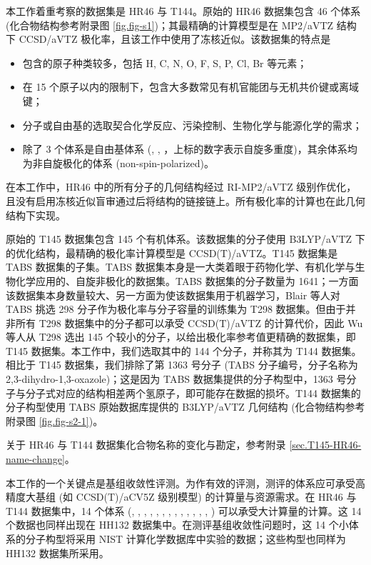 本工作着重考察的数据集是 HR46 与 T144。原始的 HR46 数据集\cite{Hickey-Rowley.JPCA.2014}包含 46 个体系 (化合物结构参考附录图 \ref{fig.fig-s1})；其最精确的计算模型是在 MP2/aVTZ 结构下 CCSD/aVTZ 极化率，且该工作中使用了冻核近似。该数据集的特点是
\begin{itemize}[nosep]
    \item 包含的原子种类较多，包括 H, C, N, O, F, S, P, Cl, Br 等元素；
    \item 在 15 个原子以内的限制下，包含大多数常见有机官能团与无机共价键或离域键；
    \item 分子或自由基的选取契合化学反应、污染控制、生物化学与能源化学的需求；
    \item 除了 3 个体系是自由基体系 (, , ，上标的数字表示自旋多重度)，其余体系均为非自旋极化的体系 (non-spin-polarized)。
\end{itemize}
在本工作中，HR46 中的所有分子的几何结构经过 RI-MP2/aVTZ 级别作优化，且没有启用冻核近似\alert{盲审通过后将结构的链接链上}。所有极化率的计算也在此几何结构下实现。

原始的 T145 数据集\cite{Wu-Thakkar.CPL.2015}包含 145 个有机体系。该数据集的分子使用 B3LYP/aVTZ 下的优化结构，最精确的极化率计算模型是 CCSD(T)/aVTZ。T145 数据集是 TABS 数据集\cite{Blair-Thakkar.CTC.2014}的子集。TABS 数据集本身是一大类着眼于药物化学、有机化学与生物化学应用的、自旋非极化的数据集。TABS 数据集的分子数量为 1641；一方面该数据集本身数量较大、另一方面为使该数据集用于机器学习，Blair 等人对 TABS 挑选 298 分子作为极化率与分子容量的训练集为 T298 数据集\cite{Blair-Thakkar.CPL.2014}。但由于并非所有 T298 数据集中的分子都可以承受 CCSD(T)/aVTZ 的计算代价，因此 Wu 等人从 T298 选出 145 个较小的分子，以给出极化率参考值更精确的数据集，即 T145 数据集\cite{Wu-Thakkar.CPL.2015}。本工作中，我们选取其中的 144 个分子，并称其为 T144 数据集。相比于 T145 数据集，我们排除了第 1363 号分子 (TABS 分子编号，分子名称为 2,3-dihydro-1,3-oxazole)；这是因为 TABS 数据集提供的分子构型中，1363 号分子与分子式对应的结构相差两个氢原子，即可能存在数据的损坏。T144 数据集的分子构型使用 TABS 原始数据库提供的 B3LYP/aVTZ 几何结构\cite{Blair-Thakkar.CTC.2014} (化合物结构参考附录图 \ref{fig.fig-s2-1})。

关于 HR46 与 T144 数据集化合物名称的变化与勘定，参考附录 \ref{sec.T145-HR46-name-change}。

本工作的一个关键点是基组收敛性评测。为作有效的评测，测评的体系应可承受高精度大基组 (如 CCSD(T)/aCV5Z 级别模型) 的计算量与资源需求。在 HR46 与 T144 数据集中，14 个体系 (, , , , , , , , , , , , , ) 可以承受大计算量的计算。这 14 个数据也同样出现在 HH132 数据集中。在测评基组收敛性问题时，这 14 个小体系的分子构型将采用 NIST 计算化学数据库中实验的数据\cite{NIST.CCCBDB}；这些构型也同样为 HH132 数据集所采用。

